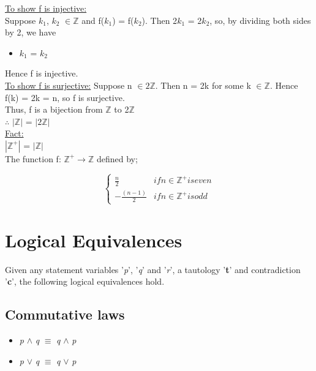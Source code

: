 \documentclass{article}
\begin{document}
\underline{To show f is injective:} \\
Suppose $k_{1}$, $k_{2}$ $\in \mathbb{Z}$ and f($k_{1}$) = f($k_{2}$). Then 2$k_{1}$ = 2$k_{2}$, so, by dividing both sides by 2, we have
\begin{itemize}
\item $k_{1}$ = $k_{2}$
\end{itemize}
Hence f is injective. \\

\underline{To show f is surjective:}
Suppose n $\in 2\mathbb{Z}$. Then n = 2k for some k $\in \mathbb{Z}$. Hence f(k) = 2k = n, so f is surjective. \\

Thus, f is a bijection from $\mathbb{Z}$ to 2$\mathbb{Z}$ \\
$\therefore$ $|\mathbb{Z}|$ = $|2\mathbb{Z}|$ \\

\underline{Fact:} \\

$|\mathbb{Z}^{+}|$ = $|\mathbb{Z}|$ \\

The function f: $\mathbb{Z}^{+} \longrightarrow \mathbb{Z}$ defined by;

\[ \begin{cases} 
      \frac{n}{2} & if n \in \mathbb{Z}^{+} is even \\
      -\frac{(n-1)}{2} & if n \in \mathbb{Z}^{+} is odd
   \end{cases}
\]

 
\section{Logical Equivalences}

Given any statement variables '\textit{p}', '\textit{q}' and '\textit{r}', a tautology '\textbf{t}' and contradiction '\textbf{c}', the following
logical equivalences hold.


\subsection{Commutative laws}
\begin{itemize} 
\item \textit{p} $\wedge$ \textit{q} $\equiv$ \textit{q} $\wedge$ \textit{p}
\item \textit{p} $\lor$ \textit{q} $\equiv$ \textit{q} $\lor$ \textit{p}
\end{itemize}
\end{document}
